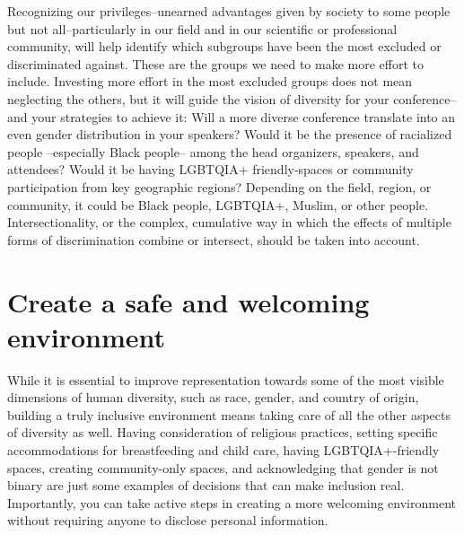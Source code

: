\documentclass[10pt,letterpaper]{article}
\begin{document}
Recognizing our privileges--unearned advantages given by society to some people but not all--particularly in our field and in our scientific or professional community, will help identify which subgroups have been the most excluded or discriminated against. 
These are the groups we need to make more effort to include. 
Investing more effort in the most excluded groups does not mean neglecting the others, but it will guide the vision of diversity for your conference--and your strategies to achieve it:
Will a more diverse conference translate into an even gender distribution in your speakers? 
Would it be the presence of racialized people --especially Black people-- among the head organizers, speakers, and attendees? 
Would it be having LGBTQIA+ friendly-spaces or community participation from key geographic regions?
Depending on the field, region, or community, it could be Black people, LGBTQIA+, Muslim, or other people.
Intersectionality, or the complex, cumulative way in which the effects of multiple forms of discrimination combine or intersect, should be taken into account. 




\section{Create a safe and welcoming environment}
\label{rule_inclusion}

While it is essential to improve representation towards some of the most visible dimensions of human diversity, such as race, gender, and country of origin, building a truly inclusive environment means taking care of all the other aspects of diversity as well. 
Having consideration of religious practices, setting specific accommodations for breastfeeding and child care, having LGBTQIA+-friendly spaces, creating community-only spaces, and acknowledging that gender is not binary are just some examples of decisions that can make inclusion real.
Importantly, you can take active steps in creating a more welcoming environment without requiring anyone to disclose personal information.
\end{document}
